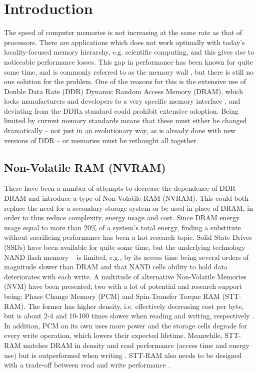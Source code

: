 \chapter{Introduction}
The speed of computer memories is not increasing at the same rate as that of processors. There are applications which does not work optimally with today's locality-focused memory hierarchy, e.g. scientific computing, and this gives rise to noticeable performance losses. This gap in performance has been known for quite some time, and is commonly referred to as the memory wall \cite{wulf1995hitting}, but there is still no one solution for the problem. One of the reasons for this is the extensive use of Double Data Rate (DDR) Dynamic Random Access Memory (DRAM), which locks manufacturers and developers to a very specific memory interface \cite{standard2008double}, and deviating from the DDRx standard could prohibit extensive adoption. Being limited by current memory standards means that these must either be changed dramatically -- not just in an evolutionary way, as is already done with new versions of DDR -- or memories must be rethought all together. 

\section{Non-Volatile RAM (NVRAM)}
There have been a number of attempts to decrease the dependence of DDR DRAM and introduce a type of Non-Volatile RAM (NVRAM). This could both replace the need for a secondary storage system or be used in place of DRAM, in order to thus reduce complexity, energy usage and cost. Since DRAM energy usage equal to more than 20\% of a system's total energy, finding a substitute without sacrificing performance has been a hot research topic\cite{4658649}. Solid State Drives (SSDs) have been available for quite some time, but the underlying technology -- NAND flash memory -- is limited, e.g., by its access time being several orders of magnitude slower than DRAM and that NAND cells ability to hold data deteriorates with each write. A multitude of alternative Non-Volatile Memories (NVM) have been presented; two with a lot of potential and research support being: Phase Change Memory (PCM) and Spin-Transfer Torque RAM (STT-RAM). The former has higher density, i.e. effectively decreasing cost per byte, but is about 2-4 and 10-100 times slower when reading and writing, respectively \cite{Qureshi:2009:SHP:1555754.1555760}\cite{5388621}. In addition, PCM on its own uses more power and the storage cells degrade for every write operation, which lowers their expected lifetime.  Meanwhile, STT-RAM matches DRAM in density and read performance (access time and energy use) but is outperformed when writing \cite{6557176}\cite{6027811}. STT-RAM also needs to be designed with a trade-off between read and write performance \cite{Wang_2013}\cite{Khvalkovskiy_2013}.
\bigskip

